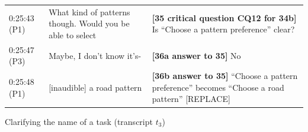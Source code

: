 \begin{tabular}{|p{17mm}|p{63mm}|p{70mm}|}
\hline
0:25:43 (P1) & What kind of patterns though. Would you be able to select & \textbf{[35 critical question CQ12 for 34b]} Is ``Choose a pattern preference'' clear?\\
\cline{1-2}
0:25:47 (P3) & Maybe, I don't know it's- & \textbf{[36a answer to 35]} No \\
\cline{1-2}
0:25:48 (P1)	& [inaudible] a road pattern& \textbf{[36b answer to 35]} ``Choose a pattern preference'' becomes ``Choose a road pattern'' \textsf{[REPLACE]}\\
\hline
\end{tabular}
\caption{Clarifying the name of a task (transcript $t_3$)}
\label{table:transcript:task-clarification}